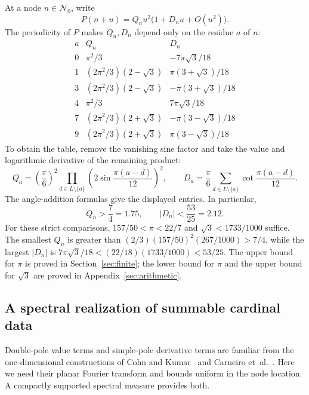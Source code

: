 At a node \(n\in\mathcal N_0\), write
\begin{equation}\label{eq:node-expansion}
 P(n+u)=Q_nu^2\bigl(1+D_nu+O(u^2)\bigr).
\end{equation}
The periodicity of \(P\) makes \(Q_n,D_n\) depend only on the residue \(a\) of \(n\):
\begin{equation}\label{eq:node-constants}
\begin{array}{c|cc}
 a&Q_n&D_n\\ \hline
 0&\pi^2/3&-7\pi\sqrt3/18\\
 1&(2\pi^2/3)(2-\sqrt3)&\pi(3+\sqrt3)/18\\
 3&(2\pi^2/3)(2-\sqrt3)&-\pi(3+\sqrt3)/18\\
 4&\pi^2/3&7\pi\sqrt3/18\\
 7&(2\pi^2/3)(2+\sqrt3)&-\pi(3-\sqrt3)/18\\
 9&(2\pi^2/3)(2+\sqrt3)&\pi(3-\sqrt3)/18
\end{array}
\end{equation}
To obtain the table, remove the vanishing sine factor and take the value and
logarithmic derivative of the remaining product:
\[
 Q_a=\left(\frac\pi6\right)^2
       \prod_{d\in L\setminus\{a\}}
        \left(2\sin\frac{\pi(a-d)}{12}\right)^2,
 \qquad
 D_a=\frac\pi6\sum_{d\in L\setminus\{a\}}
             \cot\frac{\pi(a-d)}{12}.
\]
The angle-addition formulas give the displayed entries.  In particular,
\begin{equation}\label{eq:node-constant-bounds}
 Q_n>\frac74=1.75,\qquad |D_n|<\frac{53}{25}=2.12.
\end{equation}
For these strict comparisons, \(157/50<\pi<22/7\) and
\(\sqrt3<1733/1000\) suffice.  The smallest \(Q_n\) is greater than
\((2/3)(157/50)^2(267/1000)>7/4\), while the largest \(|D_n|\) is
\(7\pi\sqrt3/18<(22/18)(1733/1000)<53/25\).
The upper bound for \(\pi\) is proved in Section~\ref{sec:finite}; the lower
bound for \(\pi\) and the upper bound for \(\sqrt3\) are proved in
Appendix~\ref{sec:arithmetic}.

\subsection{A spectral realization of summable cardinal data}

Double-pole value terms and simple-pole derivative terms are familiar from
the one-dimensional constructions of
Cohn and Kumar~\citep[Proposition~9.6]{CohnKumar2007} and Carneiro et~al.~\citep[Section~1, (1.2)--(1.3)]{CarneiroLittmannVaaler2013}.
Here we need their planar Fourier transform and bounds uniform in the node
location.  A compactly supported spectral measure provides both.

